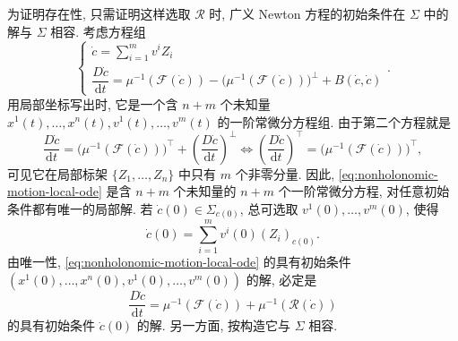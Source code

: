 \begin{RiemannProof}
为证明存在性, 只需证明这样选取 $\mathcal{R}$ 时, 广义 Newton 方程的初始条件在 $\Sigma$ 中的解与 $\Sigma$ 相容. 考虑方程组
\begin{equation}\label{eq:nonholonomic-motion-local-ode}
  \begin{cases}
    \dot c=\sum_{i=1}^m v^iZ_i\\[.4ex]
    \dfrac{D\dot c}{\mathrm{d}t}
    =\mu^{-1}(\mathcal{F}(\dot c))-\bigl(\mu^{-1}(\mathcal{F}(\dot c))\bigr)^\perp
    +B(\dot c,\dot c)
  \end{cases}.
\end{equation}
用局部坐标写出时, 它是一个含 $n+m$ 个未知量 $x^1(t),\ldots,x^n(t),v^1(t),\ldots,v^m(t)$ 的一阶常微分方程组. 由于第二个方程就是
\[
  \frac{D\dot c}{\mathrm{d}t}
  =\bigl(\mu^{-1}(\mathcal{F}(\dot c))\bigr)^\top
   +\left(\frac{D\dot c}{\mathrm{d}t}\right)^\perp
  \iff \left(\frac{D\dot c}{\mathrm{d}t}\right)^\top
  =\bigl(\mu^{-1}(\mathcal{F}(\dot c))\bigr)^\top,
\]
可见它在局部标架 $\{Z_1,\ldots,Z_n\}$ 中只有 $m$ 个非零分量. 因此, \eqref{eq:nonholonomic-motion-local-ode} 是含 $n+m$ 个未知量的 $n+m$ 个一阶常微分方程, 对任意初始条件都有唯一的局部解. 若 $\dot c(0)\in\Sigma_{c(0)}$, 总可选取 $v^1(0),\ldots,v^m(0)$, 使得
\[
  \dot c(0)=\sum_{i=1}^m v^i(0)(Z_i)_{c(0)}.
\]
由唯一性, \eqref{eq:nonholonomic-motion-local-ode} 的具有初始条件 $(x^1(0),\ldots,x^n(0),v^1(0),\ldots,v^m(0))$ 的解, 必定是
\[
  \frac{D\dot c}{\mathrm{d}t}=\mu^{-1}(\mathcal{F}(\dot c))+\mu^{-1}(\mathcal{R}(\dot c))
\]
的具有初始条件 $\dot c(0)$ 的解. 另一方面, 按构造它与 $\Sigma$ 相容.
\end{RiemannProof}

